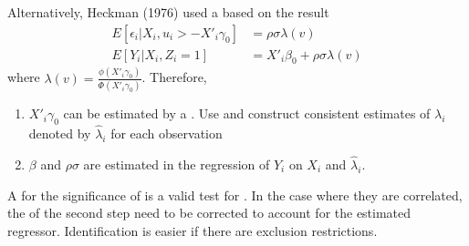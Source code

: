 Alternatively, Heckman (1976) used a  based on the result 
\begin{align*}
    E[\epsilon_i|X_i,u_i>-X'_i\gamma_0] & = \rho\sigma\lambda(v)\\
    E[Y_i|X_i,Z_i=1] & = X'_i\beta_0+\rho\sigma\lambda(v)
\end{align*}
where $\lambda(v) = \frac{\phi(X'_i\gamma_0)}{\Phi(X'_i\gamma_0)}$.
Therefore, 
\begin{enumerate}
    \item $X'_i\gamma_0$ can be estimated by a . Use and construct consistent estimates of $\lambda_i$ denoted by $\hat{\lambda}_i$ for each observation
    \item $\beta$ and $\rho\sigma$ are estimated in the  regression of $Y_i$ on $X_i$ and $\hat{\lambda}_i$.
\end{enumerate}

A  for the significance of \Emph{$\rho\sigma$} is a valid test for .
In the case where they are correlated, the  of the second step need to be corrected to account for the estimated regressor.
Identification is easier if there are exclusion restrictions. 


